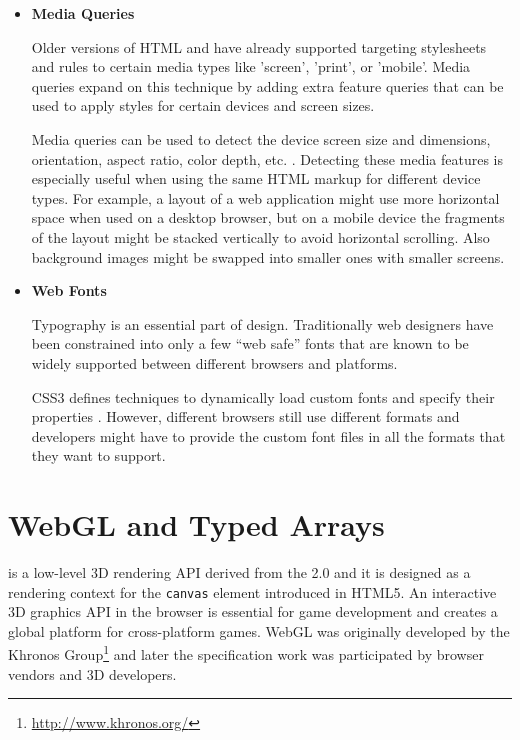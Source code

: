 \begin{itemize}
\item \textbf{Media Queries}

  Older versions of HTML and  have already supported targeting
  stylesheets and rules to certain media types like 'screen', 'print',
  or 'mobile'. Media queries expand on this technique by adding extra
  feature queries that can be used to apply styles for certain devices
  and screen sizes. \cite{mediaqueries}

  Media queries can be used to detect the device screen size and
  dimensions, orientation, aspect ratio, color depth,
  etc. \cite{mediaqueries}. Detecting these media features is especially
  useful when using the same HTML markup for different device types. For
  example, a layout of a web application might use more horizontal space
  when used on a desktop browser, but on a mobile device the fragments
  of the layout might be stacked vertically to avoid horizontal
  scrolling. Also background images might be swapped into smaller ones
  with smaller screens.

\item \textbf{Web Fonts}

  Typography is an essential part of design. Traditionally web designers
  have been constrained into only a few ``web safe'' fonts that are
  known to be widely supported between different browsers and platforms.

  CSS3 defines techniques to dynamically load custom fonts and specify
  their properties \cite{cssfonts}. However, different browsers still
  use different formats and developers might have to provide the custom
  font files in all the formats that they want to support.

\end{itemize}

\section{WebGL and Typed Arrays}

 is a low-level 3D rendering API derived from the
 2.0 \cite{OpenGL} and it is designed as a rendering
context for the \texttt{canvas} element introduced in HTML5. An
interactive 3D graphics API in the browser is essential for game
development and creates a global platform for cross-platform
games. WebGL was originally developed by the Khronos
Group\footnote{\url{http://www.khronos.org/}} and later the
specification work was participated by browser vendors and 3D
developers. \cite{WebGL}

